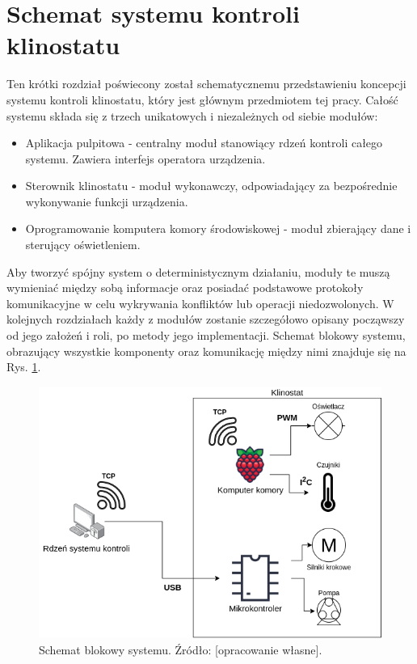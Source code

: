 \graphicspath{{./System/images}}

\chapter*{Schemat systemu kontroli klinostatu}

Ten krótki rozdział poświecony został schematycznemu przedstawieniu koncepcji systemu kontroli klinostatu, który jest głównym przedmiotem tej pracy. Całość systemu składa się z trzech unikatowych i niezależnych od siebie modułów:
\begin{itemize}

	\item Aplikacja pulpitowa - centralny moduł stanowiący rdzeń kontroli całego systemu. Zawiera interfejs operatora urządzenia.
	\item Sterownik klinostatu - moduł wykonawczy, odpowiadający za bezpośrednie wykonywanie funkcji urządzenia.
	\item Oprogramowanie komputera komory środowiskowej - moduł zbierający dane i sterujący oświetleniem.

\end{itemize}

Aby tworzyć spójny system o deterministycznym działaniu, moduły te muszą wymieniać między sobą informacje oraz posiadać podstawowe protokoły komunikacyjne w celu wykrywania konfliktów lub operacji niedozwolonych. W kolejnych rozdziałach każdy z modułów zostanie szczegółowo opisany począwszy od  jego założeń i roli, po metody jego implementacji. Schemat blokowy systemu, obrazujący wszystkie komponenty oraz komunikację między nimi znajduje się na Rys. \ref{fig:schemat_blokowy}.

\begin{figure}[ht]
	
	\centering
	\includegraphics[scale=.6]{schemat_system}
	\caption{Schemat blokowy systemu. Źródło: [opracowanie własne].}
	\label{fig:schemat_blokowy}
	
\end{figure}